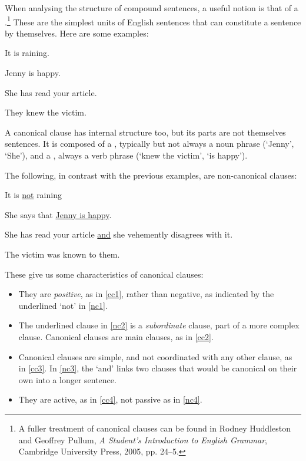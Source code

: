 When analysing the structure of compound sentences, a useful notion is that of a .\footnote{A fuller treatment of canonical clauses can be found in Rodney Huddleston and Geoffrey Pullum, \emph{A Student's Introduction to English Grammar}, Cambridge University Press, 2005, pp. 24–5.} These are the simplest units of English sentences that can constitute a sentence by themselves. Here are some examples: 
\begin{earg}
	\item[\ex{cc1}] It is raining.
	\item[\ex{cc2}] Jenny is happy.
	\item[\ex{cc3}] She has read your article.
	\item[\ex{cc4}] They knew the victim.
\end{earg}
A canonical clause has internal structure too, but its parts are not themselves sentences. It is composed of a , typically but not always a noun phrase (`Jenny', `She'), and a , always a verb phrase (`knew the victim', `is happy'). 

The following, in contrast with the previous examples, are non-canonical clauses: 
\begin{earg}
	\item[\ex{nc1}] It is \underline{not} raining
	\item[\ex{nc2}] She says that \underline{Jenny is happy}.
	\item[\ex{nc3}] She has read your article \underline{and} she vehemently disagrees with it.
	\item[\ex{nc4}] The victim was known to them.
\end{earg} These give us some characteristics of canonical clauses:
\begin{itemize}
	\item They are \emph{positive}, as in \ref{cc1}, rather than negative, as indicated by the underlined `not' in \ref{nc1}.
	\item The underlined clause in \ref{nc2} is a \emph{subordinate} clause, part of a more complex clause. Canonical clauses are main clauses, as in \ref{cc2}.
	\item Canonical clauses are simple, and not coordinated with any other clause, as in \ref{cc3}. In \ref{nc3}, the  `and' links two clauses that would be canonical on their own into a longer  sentence.
	\item They are active, as in \ref{cc4}, not passive as in \ref{nc4}.
\end{itemize}

